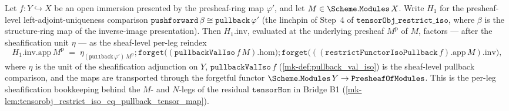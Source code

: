 \begin{lemma}\label{mk-lem:h1inv_app_eq_pullbackval_restrict}
  \leanok

  Let \(f : Y \hookrightarrow X\) be an open immersion presented by the presheaf-ring map
  \(\varphi'\), and let \(M \in \Scheme.\mathtt{Modules}\,X\). Write \(H_1\) for the presheaf-level
  left-adjoint-uniqueness comparison \(\mathtt{pushforward}\,\beta \cong
  \mathtt{pullback}\,\varphi'\) (the linchpin of Step~4 of \(\mathtt{tensorObj\_restrict\_iso}\),
  where \(\beta\) is the structure-ring map of the inverse-image presentation). Then \(H_1.\mathrm{inv}\),
  evaluated at the underlying presheaf \(M^{\mathrm p}\) of \(M\), factors --- after the sheafification
  unit \(\eta\) --- as the sheaf-level per-leg reindex
  \[
    H_1.\mathrm{inv}.\mathrm{app}\,M^{\mathrm p}
      \;=\; \eta_{(\mathtt{pullback}\,\varphi')\,M^{\mathrm p}}
        \mathbin{;} \mathtt{forget}\bigl((\mathtt{pullbackValIso}\,f\,M).\mathrm{hom}\bigr)
        \mathbin{;} \mathtt{forget}\bigl(((\mathtt{restrictFunctorIsoPullback}\,f).\mathrm{app}\,M).\mathrm{inv}\bigr),
  \]
  where \(\eta\) is the unit of the sheafification adjunction on \(Y\), \(\mathtt{pullbackValIso}\,f\)
  (\ref{mk-def:pullback_val_iso}) is the sheaf-level pullback comparison, and the maps are transported
  through the forgetful functor \(\Scheme.\mathtt{Modules}\,Y \to \mathtt{PresheafOfModules}\). This is
  the per-leg sheafification bookkeeping behind the \(M\)- and \(N\)-legs of the residual
  \(\mathtt{tensorHom}\) in Bridge B1 (\ref{mk-lem:tensorobj_restrict_iso_eq_pullback_tensor_map}).
\end{lemma}
